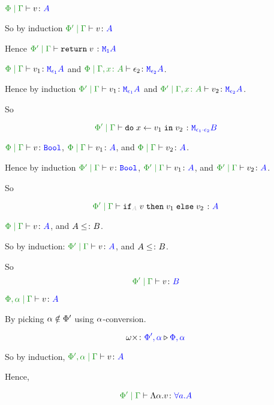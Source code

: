{    \bi $\gpetyperelation{v}{A}$ 
    
    So by induction $\gppetyperelation{v}{A}$

    Hence $\gppetyperelation{\return{v}}{\moa}$


    \bi $\gpetyperelation{v_1}{\M{\e_1}{A}}$ and $\etyperelation{\P}{\gax}{\e_2}{\M{\e_2}{A}}$.

    Hence by induction $\gppetyperelation{v_1}{\M{\e_1}{A}}$ and $\etyperelation{\P'}{\gax}{v_2}{\M{\e_2}{A}}$.

    So

    \begin{equation}
        \gppetyperelation{\doin{x}{v_1}{v_2}}{\M{\e_1\dot\e_2}{B}}
    \end{equation}


    \bi $\gpetyperelation{v}{\B}$, $\gpetyperelation{v_1}{A}$, and $\gpetyperelation{v_2}{A}$.

    Hence by induction
    $\gppetyperelation{v}{\B}$, $\gppetyperelation{v_1}{A}$, and $\gppetyperelation{v_2}{A}$.

    So 

    \begin{equation}
        \gppetyperelation{\pifthenelse{A}{v}{v_1}{v_2}}{A}
    \end{equation}

    \bi $\gpetyperelation{v}{A}$, and $A\leq\colon B$.

    So by induction:
    $\gppetyperelation{v}{A}$, and $A\leq\colon B$.

    So \begin{equation}
        \gppetyperelation{v}{B}
    \end{equation}

    \bi $\etyperelation{\P, \a}{\G}{v}{A}$

    By picking $\alpha\notin\Phi'$ using $\alpha$-conversion.

    \begin{equation}
        \omega\times \colon {\color{blue}\Phi',\alpha} \triangleright {\color {blue} \Phi,\alpha}
    \end{equation}

    So by induction, $\etyperelation{\P', \a}{\G}{v}{A}$

    Hence,

    \begin{equation}
        \gppetyperelation{\elam{\a}{v}}{\all{a}{A}}
    \end{equation}

}
